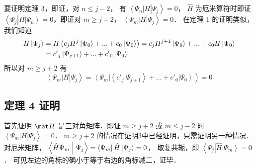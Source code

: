 要证明定理 3，即证，对 $n \leqslant j - 2$， 有 $\left\langle {{\Psi_n}} \right|H\left| {{\Psi_j}} \right\rangle  = 0$， $\hat H$ 为厄米算符时即证 $\left\langle {{\Psi_j}} \right|H\left| {{\Psi_n}} \right\rangle  = 0$，即证对 $m \geqslant j + 2$，  $\left\langle {{\Psi_m}} \right|H\left| {{\Psi_j}} \right\rangle  = 0$． 在定理 1 的证明类似，我们知道
\begin{equation}\begin{aligned}
  H\left| {\Psi_j} \right\rangle  &= H\left( {{c_j}{H^j}\left| {\Psi_0} \right\rangle  + ... + {c_0}\left| {\Psi_0} \right\rangle } \right) = {c_j}{H^{j + 1}}\left| {\Psi_0} \right\rangle  + ... + {c_0}H\left| {\Psi_0} \right\rangle \\
&= {{c'}_j}\left| {\Psi_{j + 1}} \right\rangle  + ... + {{c'}_0}\left| {\Psi_0} \right\rangle  \hfill \\ 
\end{aligned}\end{equation}
所以对 $m \geqslant j + 2$ 有
\begin{equation}
\left\langle {\Psi_m} \right|H\left| {\Psi_j} \right\rangle  = \left\langle {\Psi_m} \right|\left( {{{c'}_j}\left| {\Psi_{j + 1}} \right\rangle  + ... + {{c'}_0}\left| {\Psi_0} \right\rangle } \right) = 0
\end{equation}

\subsection{定理 4 证明}

首先证明 $\mat H$ 是三对角矩阵．即证 $m \geqslant j + 2$ 或 $m \leqslant j - 2$ 时 {$\left\langle {{\Psi_m}} \right|H\left| {{\Psi_j}} \right\rangle  = 0$．}
$m \geqslant j + 2$ 的情况在证明3中已经证明，只需证明另一种情况．
对厄米矩阵， $\left\langle {{\hat H{\Psi_m}}}
 \mathrel{\left | {\vphantom {{\hat H{\Psi_m}} {{\Psi_j}}}}
 \right. \kern-\nulldelimiterspace}
 {{{\Psi_j}}} \right\rangle  = \left\langle {{\Psi_m}} \right| \hat H\left| {{\Psi_j}} \right\rangle  = 0$， 取复共轭，即 $\left\langle {{\Psi_j}} \right|\hat H\left| {{\Psi_m}} \right\rangle  = 0$． 可见左边的角标的确小于等于右边的角标减二，证毕．

